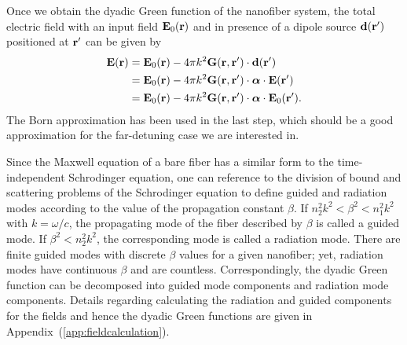 \documentclass[preprint,aps,pra,onecolumn]{revtex4-1} %
\begin{document}
Once we obtain the dyadic Green function of the nanofiber system, the total electric field with an input field $\mathbf{E}_0(\mathbf{r})$ and in presence of a dipole source $\mathbf{d}(\mathbf{r}')$ positioned at $\mathbf{r}'$ can be given by
\begin{align}
\mathbf{E}(\mathbf{r}) &= \mathbf{E}_0(\mathbf{r})-4\pi k^2\mathbf{G}(\mathbf{r},\mathbf{r}')\cdot \mathbf{d}(\mathbf{r}')\\
&=\mathbf{E}_0(\mathbf{r})-4\pi k^2 \mathbf{G}(\mathbf{r},\mathbf{r}')\cdot \boldsymbol{\alpha}\cdot \mathbf{E}(\mathbf{r}')\\
&=\mathbf{E}_0(\mathbf{r})-4\pi k^2 \mathbf{G}(\mathbf{r},\mathbf{r}')\cdot \boldsymbol{\alpha}\cdot \mathbf{E}_0(\mathbf{r}').
\end{align}
The Born approximation has been used in the last step, which should be a good approximation for the far-detuning case we are interested in. 

Since the Maxwell equation of a bare fiber has a similar form to the time-independent Schrodinger equation, one can reference to the division of bound and scattering problems of the Schrodinger equation to define guided and radiation modes according to the value of the propagation constant $ \beta $. If $ n_2^2k^2<\beta^2<n_1^2k^2 $ with $ k=\omega/c $, the propagating mode of the fiber described by $ \beta $ is called a guided mode. If $ \beta^2<n_2^2k^2 $, the corresponding mode is called a radiation mode. There are finite guided modes with discrete $ \beta $ values for a given nanofiber; yet, radiation modes have continuous $ \beta $ and are countless. Correspondingly, the dyadic Green function can be decomposed into guided mode components and radiation mode components. Details regarding calculating the radiation and guided components for the fields and hence the dyadic Green functions are given in Appendix~(\ref{app:fieldcalculation}).   
\end{document}

